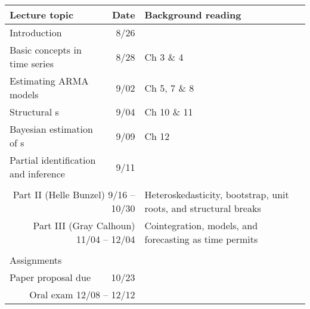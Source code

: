 \documentclass[nofonts]{tufte-handout}
\renewcommand{\allcaps}[1]{\textls{\MakeUppercase{#1}}}
\newcommand{\VAR}{\allcaps{VAR}}
\begin{document}
\begin{table*}[t]
\begin{tabularx}{\textwidth}{lrX}
  \toprule
  Lecture topic                                                     & Date & Background reading                                             \\
  \midrule
  Introduction                                                      & 8/26 & \citep{Lu76} \citep{No11} \citep{Si12}                         \\
  Basic concepts in time series                                     & 8/28 & \citep{Ha94} Ch 3 \& 4                                         \\
  Estimating ARMA models                                            & 9/02 & \citep{Ha94} Ch 5, 7 \& 8                                      \\
  Structural \VAR s                                                 & 9/04 & \citep{Ha94} Ch 10 \& 11                                       \\
  Bayesian estimation of \VAR s                                     & 9/09 & \citep{Ha94} Ch 12                                             \\
  Partial identification and inference                              & 9/11 & \citep{Ki13}                                                   \\
                                                                                                                                            \\
  \multicolumn{2}{r}{Part II (Helle Bunzel) \hfill 9/16 -- 10/30}   & Heteroskedasticity, bootstrap, unit roots, and structural breaks      \\
  \multicolumn{2}{r}{Part III (Gray Calhoun) \hfill 11/04 -- 12/04} & Cointegration, \allcaps{DSGE} models, and forecasting as time permits \\
                                                                                                                                            \\
  Assignments                                                                                                                               \\
  \cmidrule{1-2}
  Paper proposal due                                                & 10/23                                                                 \\
  \multicolumn{2}{r}{Oral exam \hfill 12/08 -- 12/12}                                                                                       \\

\end{tabularx}
\end{table*}
\end{document}

